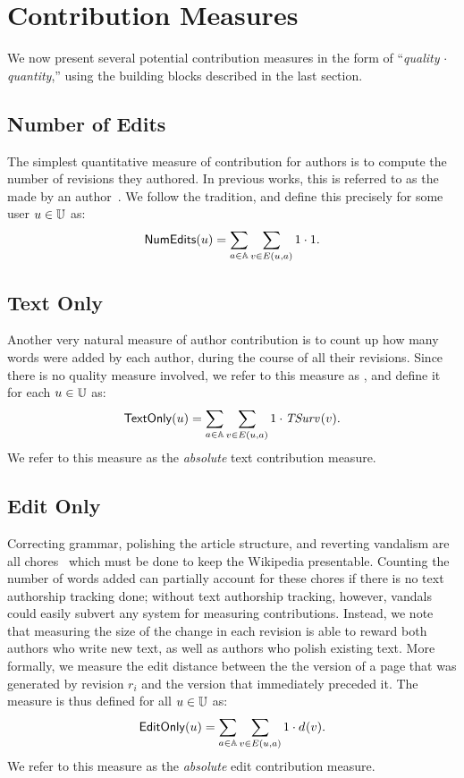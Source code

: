 \section{Contribution Measures}

We now present several potential contribution measures in the form of
``\textit{quality} $\cdot$ \textit{quantity},''
using the building blocks described in the last section.

\subsection{Number of Edits}

\noindent
The simplest quantitative measure of contribution for 
authors is to compute the number of revisions they authored.
In previous works, this is referred to as the 
 made by an 
author~\cite{Wales2005,EditsEqQuality2007,Bourgeoisie2007,SteinHess2007}.
We follow the tradition, and define this precisely
for some user $u \in \mathbb{U}$ as:
%
\[
\mathsf{NumEdits}(u) = \sum_{a \in \mathbb{A}} \sum_{v \in E(u, a)} 1 \cdot 1.
\]
%

\subsection{Text Only}

\noindent
Another very natural measure of author contribution
is to count up how many words were added by each author,
during the course of all their revisions.
Since there is no quality measure involved,
we refer to this measure as \textonly,
and define it for each $u \in \mathbb{U}$ as:
%
\[
\mathsf{TextOnly}(u) = \sum_{a \in \mathbb{A}} \sum_{v \in E(u, a)} 1 \cdot \mathit{TSurv}_{}(v).
\]
%
We refer to this measure as the {\em absolute\/} text contribution
measure.

\subsection{Edit Only}

\noindent
Correcting grammar, polishing the article structure,
and reverting vandalism are all chores~\cite{AdministratorMop2008}
which must be done to keep the Wikipedia presentable.
Counting the number of words added can partially account
for these chores if there is no text authorship tracking done;
without text authorship tracking, however, vandals could
easily subvert any system for measuring contributions.
Instead, we note that measuring the size of the change
in each revision is able to reward both authors who write
new text, as well as authors who polish existing text.
More formally, we measure the edit distance between the
the version of a page that was generated by revision $r_i$
and the version that immediately preceded it.
The \editonly measure is thus defined for all $u \in \mathbb{U}$ as:
%
\[
\mathsf{EditOnly}(u) = \sum_{a \in \mathbb{A}} \sum_{v \in E(u, a)} 1 \cdot d_{}(v).
\]
%
We refer to this measure as the {\em absolute\/} edit contribution
measure.

